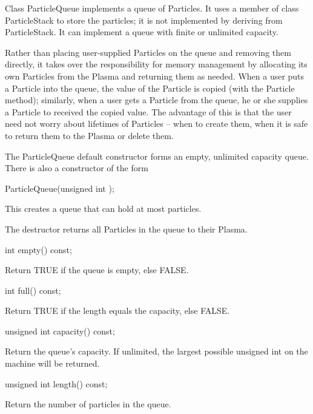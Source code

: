 Class ParticleQueue implements a queue of Particles.  It uses a member
of class ParticleStack to store the particles; it is not implemented
by deriving from ParticleStack.  It can implement a queue with finite
or unlimited capacity.

Rather than placing user-supplied Particles on the queue and removing
them directly, it takes over the responsibility for memory management
by allocating its own Particles from the Plasma and returning them
as needed.  When a user puts a Particle into the queue, the value of
the Particle is copied (with the Particle  method);
similarly, when a user gets a Particle from the queue, he or she
supplies a Particle to received the copied value.  The advantage of
this is that the user need not worry about lifetimes of Particles --
when to create them, when it is safe to return them to the Plasma
or delete them.

The ParticleQueue default constructor forms an empty, unlimited capacity
queue.  There is also a constructor of the form

\begin{example}
ParticleQueue(unsigned int );
\end{example}

This creates a queue that can hold at most  particles.

The destructor returns all Particles in the queue to their Plasma.

\begin{example}
int empty() const;
\end{example}

Return TRUE if the queue is empty, else FALSE.

\begin{example}
int full() const;
\end{example}

Return TRUE if the length equals the capacity, else FALSE.

\begin{example}
unsigned int capacity() const;
\end{example}

Return the queue's capacity.  If unlimited, the largest possible
unsigned int on the machine will be returned.

\begin{example}
unsigned int length() const;
\end{example}

Return the number of particles in the queue.

